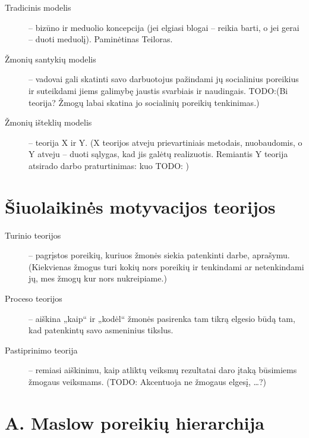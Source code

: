 \begin{description}
  \item[Tradicinis modelis] – bizūno ir meduolio koncepcija (jei elgiasi
    blogai – reikia barti, o jei gerai – duoti meduolį). Paminėtinas
    Teiloras.
  \item[Žmonių santykių modelis] – vadovai gali skatinti savo darbuotojus
    pažindami jų socialinius poreikius ir suteikdami jiems galimybę
    jaustis svarbiais ir naudingais. TODO:(Bi~ teorija? Žmogų labai skatina
    jo socialinių poreikių tenkinimas.)
  \item[Žmonių išteklių modelis] – teorija X ir Y. (X teorijos atveju
    prievartiniais metodais, nuobaudomis, o Y atveju – duoti sąlygas,
    kad jis galėtų realizuotis. Remiantis Y teorija atsirado darbo
    praturtinimas: kuo TODO: )
\end{description}

\section{Šiuolaikinės motyvacijos teorijos}

\begin{description}
  \item[Turinio teorijos] – pagrįstos poreikių, kuriuos žmonės siekia 
    patenkinti darbe, aprašymu. (Kiekvienas žmogus turi kokių nors
    poreikių ir tenkindami ar netenkindami jų, mes žmogų kur nors
    nukreipiame.)
  \item[Proceso teorijos] – aiškina „kaip“ ir „kodėl“ žmonės pasirenka
    tam tikrą elgesio būdą tam, kad patenkintų savo asmeninius tikslus.
  \item[Pastiprinimo teorija] – remiasi aiškinimu, kaip atliktų
    veiksmų rezultatai daro įtaką būsimiems žmogaus veiksmams. (TODO:
    Akcentuoja ne žmogaus elgesį, …?)
\end{description}

\section{A. Maslow poreikių hierarchija}

\label{sec:maslow}

